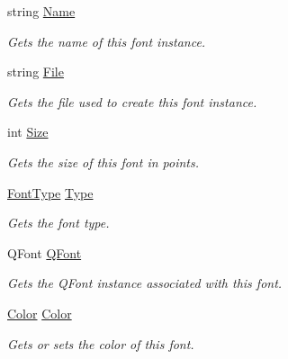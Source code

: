 \begin{DoxyCompactItemize}
\item 
string \hyperlink{class_tri_devs_1_1_tri_engine_1_1_text_1_1_font_a20de06ff34d29e2bf82a646927af1111}{Name}
\begin{DoxyCompactList}\small\item\em Gets the name of this font instance. \end{DoxyCompactList}\item 
string \hyperlink{class_tri_devs_1_1_tri_engine_1_1_text_1_1_font_a182e4fefabd538c9bc2e265f5e8e9368}{File}
\begin{DoxyCompactList}\small\item\em Gets the file used to create this font instance. \end{DoxyCompactList}\item 
int \hyperlink{class_tri_devs_1_1_tri_engine_1_1_text_1_1_font_ad1d80ab21007e0379a2d18dda7e0b2a2}{Size}
\begin{DoxyCompactList}\small\item\em Gets the size of this font in points. \end{DoxyCompactList}\item 
\hyperlink{namespace_tri_devs_1_1_tri_engine_1_1_text_a823573b800952d8909dc50e1efa3358b}{Font\-Type} \hyperlink{class_tri_devs_1_1_tri_engine_1_1_text_1_1_font_a99190b803ae96c50fa724b578a8c03a6}{Type}
\begin{DoxyCompactList}\small\item\em Gets the font type. \end{DoxyCompactList}\item 
Q\-Font \hyperlink{class_tri_devs_1_1_tri_engine_1_1_text_1_1_font_ad39abcf6c6505e2d522b27a8ff65e554}{Q\-Font}
\begin{DoxyCompactList}\small\item\em Gets the Q\-Font instance associated with this font. \end{DoxyCompactList}\item 
\hyperlink{struct_tri_devs_1_1_tri_engine_1_1_color}{Color} \hyperlink{class_tri_devs_1_1_tri_engine_1_1_text_1_1_font_a105a762f5fe79ea55c3134fca61ac709}{Color}
\begin{DoxyCompactList}\small\item\em Gets or sets the color of this font. \end{DoxyCompactList}\end{DoxyCompactItemize}


